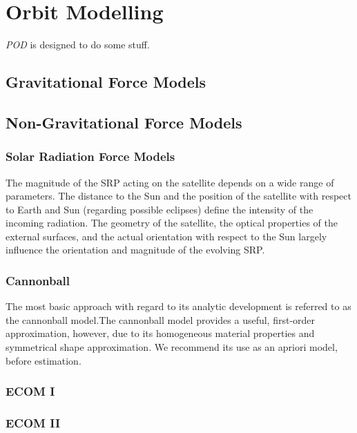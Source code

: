 \chapter{Orbit Modelling}
\label{ch:orbit_modelling}


\textit{POD} is designed to do some stuff.

\section{Gravitational Force Models}

\section{Non-Gravitational Force Models}

\subsection{Solar Radiation Force Models}
The magnitude of the SRP acting on the satellite depends on a wide range of parameters. 
The distance to the Sun and the position of the satellite with respect to Earth and Sun (regarding possible eclipses) define the intensity of the incoming radiation.
 The geometry of the satellite, the optical properties of the external surfaces, and the actual orientation with respect to the Sun largely influence the orientation and magnitude of the evolving SRP.
 
\subsection{Cannonball}
\label{sec:cannonball_srp}
The most basic approach with regard to its analytic development is referred to as the cannonball
model.The cannonball model provides a useful, first-order approximation, however, due to its homogeneous material properties and symmetrical shape approximation. We recommend its use as an apriori model, before estimation.

\subsection{ECOM I}

\subsection{ECOM II}

